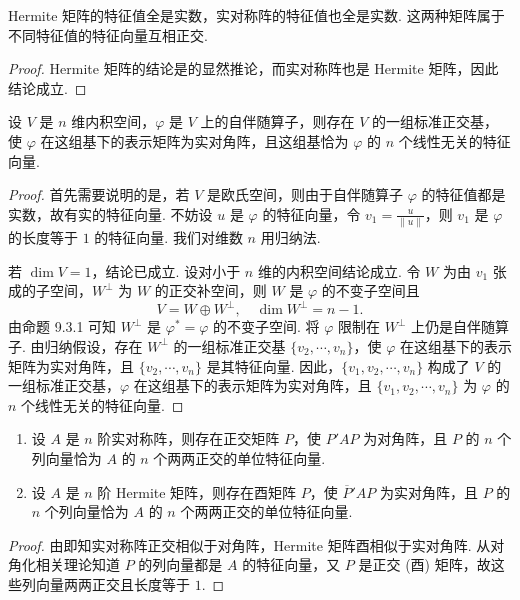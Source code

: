\documentclass[../../main.tex]{subfiles}
\begin{document}
\begin{corollary}\label{corollary:Hermite矩阵和实对称矩阵关于特征值的相关性质}
Hermite 矩阵的特征值全是实数，实对称阵的特征值也全是实数. 这两种矩阵属于不同特征值的特征向量互相正交.
\end{corollary}
\begin{proof}
Hermite 矩阵的结论是的显然推论，而实对称阵也是 Hermite 矩阵，因此结论成立.
\end{proof}

\begin{theorem}\label{theorem:关于自伴随算子正交对角化}
设 $V$ 是 $n$ 维内积空间，$\varphi$ 是 $V$ 上的自伴随算子，则存在 $V$ 的一组标准正交基，使 $\varphi$ 在这组基下的表示矩阵为实对角阵，且这组基恰为 $\varphi$ 的 $n$ 个线性无关的特征向量.
\end{theorem}
\begin{proof}
首先需要说明的是，若 $V$ 是欧氏空间，则由于自伴随算子 $\varphi$ 的特征值都是实数，故有实的特征向量. 不妨设 $u$ 是 $\varphi$ 的特征向量，令 $v_1 = \frac{u}{\|u\|}$，则 $v_1$ 是 $\varphi$ 的长度等于 $1$ 的特征向量. 我们对维数 $n$ 用归纳法.

若 $\dim V = 1$，结论已成立. 设对小于 $n$ 维的内积空间结论成立. 令 $W$ 为由 $v_1$ 张成的子空间，$W^\perp$ 为 $W$ 的正交补空间，则 $W$ 是 $\varphi$ 的不变子空间且
\[
V = W \oplus W^\perp, \quad \dim W^\perp = n - 1.
\]
由命题 9.3.1 可知 $W^\perp$ 是 $\varphi^* = \varphi$ 的不变子空间. 将 $\varphi$ 限制在 $W^\perp$ 上仍是自伴随算子. 由归纳假设，存在 $W^\perp$ 的一组标准正交基 $\{v_2,\cdots,v_n\}$，使 $\varphi$ 在这组基下的表示矩阵为实对角阵，且 $\{v_2,\cdots,v_n\}$ 是其特征向量. 因此，$\{v_1,v_2,\cdots,v_n\}$ 构成了 $V$ 的一组标准正交基，$\varphi$ 在这组基下的表示矩阵为实对角阵，且 $\{v_1,v_2,\cdots,v_n\}$ 为 $\varphi$ 的 $n$ 个线性无关的特征向量.
\end{proof}

\begin{theorem}\label{theorem:实对称和Hermite矩阵的正交对角化}
\begin{enumerate}
\item 设 $A$ 是 $n$ 阶实对称阵，则存在正交矩阵 $P$，使 $P'AP$ 为对角阵，且 $P$ 的 $n$ 个列向量恰为 $A$ 的 $n$ 个两两正交的单位特征向量.

\item 设 $A$ 是 $n$ 阶 Hermite 矩阵，则存在酉矩阵 $P$，使 $\overline{P}'AP$ 为实对角阵，且 $P$ 的 $n$ 个列向量恰为 $A$ 的 $n$ 个两两正交的单位特征向量.
\end{enumerate}
\end{theorem}
\begin{proof}
由即知实对称阵正交相似于对角阵，Hermite 矩阵酉相似于实对角阵. 从对角化相关理论知道 $P$ 的列向量都是 $A$ 的特征向量，又 $P$ 是正交 (酉) 矩阵，故这些列向量两两正交且长度等于 $1$. 
\end{proof}
\end{document}
